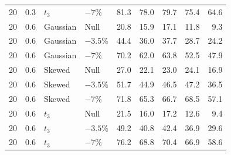 \begin{table}[H]
\begin{tabular*}{\textwidth}{@{\extracolsep{\fill}}rrllrrrrr}
20 & 0.3 & $t_3$ & $-7\%$ & 81.3 & 78.0 & 79.7 & 75.4 & 64.6 \\
20 & 0.6 & Gaussian & Null & 20.8 & 15.9 & 17.1 & 11.8 & 9.3 \\
20 & 0.6 & Gaussian & $-3.5\%$ & 44.4 & 36.0 & 37.7 & 28.7 & 24.2 \\
20 & 0.6 & Gaussian & $-7\%$ & 70.2 & 62.0 & 63.8 & 52.5 & 47.9 \\
20 & 0.6 & Skewed & Null & 27.0 & 22.1 & 23.0 & 24.1 & 16.9 \\
20 & 0.6 & Skewed & $-3.5\%$ & 51.7 & 44.9 & 46.5 & 47.2 & 36.5 \\
20 & 0.6 & Skewed & $-7\%$ & 71.8 & 65.3 & 66.7 & 68.5 & 57.1 \\
20 & 0.6 & $t_3$ & Null & 21.5 & 16.0 & 17.2 & 12.6 & 9.4 \\
20 & 0.6 & $t_3$ & $-3.5\%$ & 49.2 & 40.8 & 42.4 & 36.9 & 29.6 \\
20 & 0.6 & $t_3$ & $-7\%$ & 76.2 & 68.8 & 70.4 & 66.9 & 58.6 \\
\bottomrule
\end{tabular*}
\end{table}

